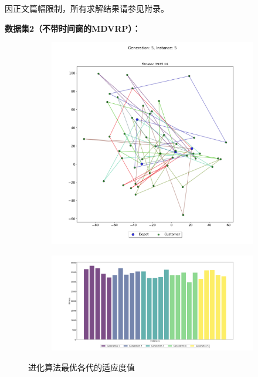 \documentclass[12pt,a4paper,oneside]{ctexart}
\begin{document}
\vspace{1em}
\noindent 因正文篇幅限制，所有求解结果请参见附录。

\newpage
\textbf{数据集2（不带时间窗的MDVRP）：}

\begin{figure}[htbp]
	\centering
	\begin{subfigure}[b]{0.316\textwidth}
		\centering
		\includegraphics[width=\textwidth]{fig/11.png}
	\end{subfigure}
	\hspace{2pt} %
	\begin{subfigure}[b]{0.4\textwidth}
		\centering
		\includegraphics[width=\textwidth]{fig/12.png}
	\end{subfigure}
	\caption{进化算法最优各代的适应度值}
\end{figure}
\end{document}
